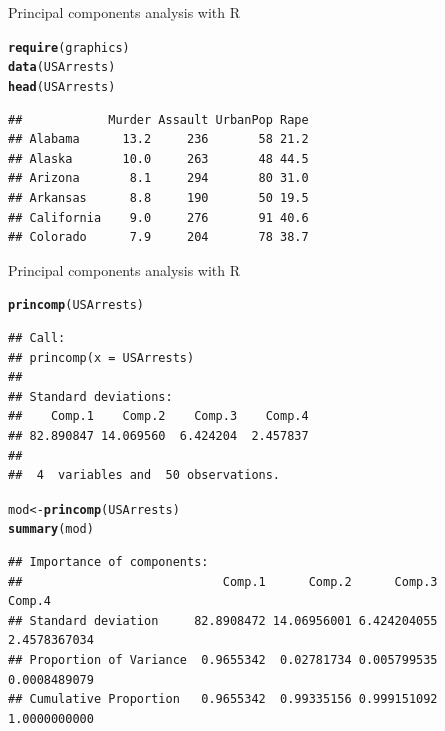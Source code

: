 \documentclass[10pt,xcolor=dvipsnames]{beamer}\usepackage[]{graphicx}\usepackage[]{color}
\makeatletter
\newcommand{\hlstd}[1]{\textcolor[rgb]{0.345,0.345,0.345}{#1}}%
\newcommand{\hlkwb}[1]{\textcolor[rgb]{0.69,0.353,0.396}{#1}}%
\newcommand{\hlkwd}[1]{\textcolor[rgb]{0.737,0.353,0.396}{\textbf{#1}}}%
\newenvironment{kframe}{%
 \def\at@end@of@kframe{}%
 \ifinner\ifhmode%
  \def\at@end@of@kframe{\end{minipage}}%
  \begin{minipage}{\columnwidth}%
 \fi\fi%
 \def\FrameCommand##1{\hskip\@totalleftmargin \hskip-\fboxsep
 \colorbox{shadecolor}{##1}\hskip-\fboxsep
     \hskip-\linewidth \hskip-\@totalleftmargin \hskip\columnwidth}%
 \MakeFramed {\advance\hsize-\width
   \@totalleftmargin\z@ \linewidth\hsize
   \@setminipage}}%
 {\par\unskip\endMakeFramed%
 \at@end@of@kframe}
\newenvironment{knitrout}{}{} %
\makeatother
\begin{document}
\begin{frame}{Principal components analysis with R}

\begin{knitrout}\footnotesize
{}\color{fgcolor}\begin{kframe}
\begin{alltt}
\hlkwd{require}\hlstd{(graphics)}
\hlkwd{data}\hlstd{(USArrests)}
\hlkwd{head}\hlstd{(USArrests)}
\end{alltt}
\begin{verbatim}
##            Murder Assault UrbanPop Rape
## Alabama      13.2     236       58 21.2
## Alaska       10.0     263       48 44.5
## Arizona       8.1     294       80 31.0
## Arkansas      8.8     190       50 19.5
## California    9.0     276       91 40.6
## Colorado      7.9     204       78 38.7
\end{verbatim}
\end{kframe}
\end{knitrout}
\end{frame}


\begin{frame}{Principal components analysis with R}

\begin{knitrout}\footnotesize
{}\color{fgcolor}\begin{kframe}
\begin{alltt}
\hlkwd{princomp}\hlstd{(USArrests)}
\end{alltt}
\begin{verbatim}
## Call:
## princomp(x = USArrests)
## 
## Standard deviations:
##    Comp.1    Comp.2    Comp.3    Comp.4 
## 82.890847 14.069560  6.424204  2.457837 
## 
##  4  variables and  50 observations.
\end{verbatim}
\begin{alltt}
\hlstd{mod} \hlkwb{<-} \hlkwd{princomp}\hlstd{(USArrests)}
\hlkwd{summary}\hlstd{(mod)}
\end{alltt}
\begin{verbatim}
## Importance of components:
##                            Comp.1      Comp.2      Comp.3       Comp.4
## Standard deviation     82.8908472 14.06956001 6.424204055 2.4578367034
## Proportion of Variance  0.9655342  0.02781734 0.005799535 0.0008489079
## Cumulative Proportion   0.9655342  0.99335156 0.999151092 1.0000000000
\end{verbatim}
\end{kframe}
\end{knitrout}
\end{frame}
\end{document}
